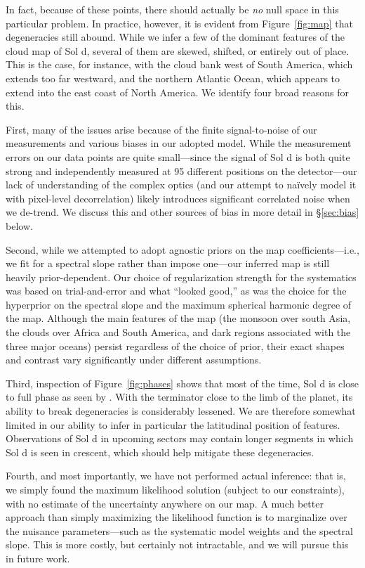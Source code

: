 \documentclass[modern]{aastex62}
\begin{document}
In fact, because of these points, there should actually be \emph{no} null space 
in this particular problem. In practice, however, it is evident from
Figure~\ref{fig:map} that degeneracies still abound. While we infer a few of the
dominant features of the cloud map of Sol d, several of them are skewed, 
shifted, or entirely out of place. This is the case, for instance, with
the cloud bank west of South America, which extends too far westward, and
the northern Atlantic Ocean, which appears to extend into the east coast of
North America. We identify four broad reasons for this.

First, many of the issues arise because
of the finite signal-to-noise of our measurements and various biases in
our adopted model. While the measurement errors on our data points are
quite small---since the signal of Sol d is both quite strong and independently
measured at 95 different positions on the detector---our lack of understanding
of the complex optics (and our
attempt to na{\"i}vely model it with pixel-level decorrelation) likely
introduces significant correlated noise when we de-trend. We discuss this
and other sources of bias in more detail in \S\ref{sec:bias} below.

Second, while we attempted to adopt agnostic priors on the map coefficients---i.e.,
we fit for a spectral slope rather than impose one---our inferred map is still 
heavily prior-dependent. Our choice of regularization strength for the systematics
was based on trial-and-error and what ``looked good,'' as was the choice for the 
hyperprior on the spectral
slope and the maximum spherical harmonic degree of the map. Although the main
features of the map (the monsoon over south Asia, the clouds over Africa and
South America, and dark regions associated with the three major oceans) persist
regardless of the choice of prior, their exact shapes and contrast vary
significantly under different assumptions.

Third, inspection of Figure~\ref{fig:phases} shows that most of the time, Sol
d is close to full phase as seen by \TESS.
With the terminator close to the limb
of the planet, its ability to break degeneracies is considerably lessened.
We are therefore somewhat limited in our ability to infer in particular the
latitudinal position of features. Observations of Sol d in upcoming
sectors may contain longer segments in which Sol d is seen in crescent,
which should help mitigate these degeneracies.

Fourth, and most importantly, we have not performed actual inference: that is, 
we simply found the maximum likelihood solution (subject to our constraints),
with no estimate of the uncertainty anywhere on our map. A much better
approach than simply maximizing the likelihood function is to marginalize
over the nuisance parameters---such as the systematic model weights and the spectral
slope. This is more costly, but certainly not intractable, and we will
pursue this in future work.
\end{document}
